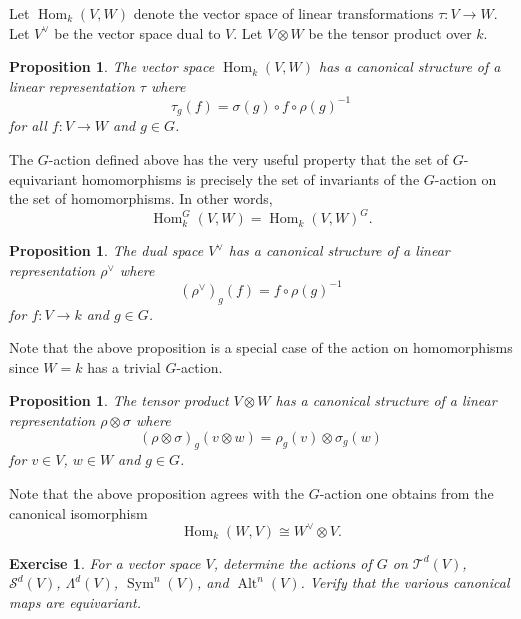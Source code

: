 \documentclass[12pt]{article}
\theoremstyle{plain}
\newtheorem{proposition}[theorem]{Proposition}
\newtheorem{exercise}[theorem]{Exercise}
\theoremstyle{definition}
\theoremstyle{remark}
\numberwithin{equation}{section}
\begin{document}
Let $\operatorname{Hom}_k(V,W)$ denote the vector space of linear transformations
$\tau : V \to W$.
Let $V^\vee$ be the vector space dual to $V$.
Let $V \otimes W$ be the tensor product over $k$.

\begin{proposition}
The vector space $\operatorname{Hom}_k(V,W)$ has a canonical structure of a linear
representation $\tau$ where
\[
 \tau_g(f) = \sigma(g) \circ f \circ \rho(g)^{-1}
\]
for all $f : V \to W$ and $g \in G$.
\end{proposition}

The $G$-action defined above has the very useful property that
the set of $G$-equivariant homomorphisms is precisely the set of invariants of the
$G$-action on the set of homomorphisms.  In other words,
\[
\operatorname{Hom}^G_k(V,W) = \operatorname{Hom}_k(V,W)^G .
\]

\begin{proposition}
The dual space $V^\vee$ has a canonical structure of a linear
representation $\rho^\vee$ where
\[
 (\rho^\vee)_g(f) = f \circ \rho(g)^{-1}
\]
for $f : V \to k$ and $g \in G$.
\end{proposition}

Note that the above proposition is a special case of the action on
homomorphisms since $W=k$ has a trivial $G$-action.

\begin{proposition}
The tensor product $V \otimes W$ has a canonical structure of a linear
representation $\rho \otimes \sigma$ where
\[
(\rho \otimes \sigma)_g(v \otimes w) = \rho_g(v) \otimes \sigma_g(w)
\]
for $v \in V$, $w \in W$ and $g \in G$.
\end{proposition}

Note that the above proposition agrees with the $G$-action one
obtains from the canonical isomorphism
\[
\operatorname{Hom}_k(W,V) \cong W^\vee \otimes V. 
\]

\begin{exercise}
For a vector space $V$,
determine the actions of $G$ on
$\mathcal{T}^d(V)$, $\mathcal{S}^d(V)$, $\Lambda^d(V)$,
$\operatorname{Sym}^n(V)$, and $\operatorname{Alt}^n(V)$.
Verify that the various canonical maps are equivariant.
\end{exercise}




\end{document}
